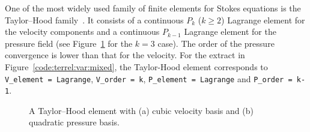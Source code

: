 One of the most widely used family of finite elements for Stokes
equations is the Taylor--Hood family~\citep{TaylorHood1973,Boffi1997}.
It consists of a continuous $P_k$ ($k\geq 2$) Lagrange element for the
velocity components and a continuous $P_{k-1}$ Lagrange element for the
pressure field (see Figure~\ref{fig:terrel:THElements} for the $k=3$
case). The order of the pressure convergence is lower than that for the
velocity.  For the \ufl{} extract in Figure~\ref{code:terrel:var:mixed},
the Taylor-Hood element corresponds to {\tt V\_element = Lagrange},
{\tt V\_order = k}, {\tt P\_element = Lagrange} and {\tt P\_order = k-1}.
%
\begin{figure}
  \center
  \hspace{2em}
  \caption{A Taylor--Hood element with (a) cubic velocity basis and (b)
  quadratic pressure basis.}
\label{fig:terrel:THElements}
\end{figure}

